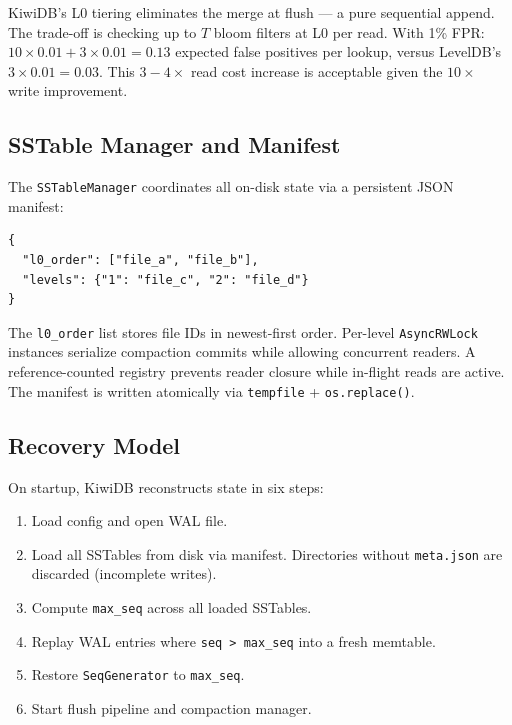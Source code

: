 \documentclass[conference]{IEEEtran}
\begin{document}
KiwiDB's L0 tiering eliminates the merge at flush --- a pure sequential append. The trade-off is checking up to $T$ bloom filters at L0 per read. With 1\% FPR: $10 \times 0.01 + 3 \times 0.01 = 0.13$ expected false positives per lookup, versus LevelDB's $3 \times 0.01 = 0.03$. This $3{-}4\times$ read cost increase is acceptable given the $10\times$ write improvement.

\subsection{SSTable Manager and Manifest}

The \texttt{SSTableManager} coordinates all on-disk state via a persistent JSON manifest:

\begin{lstlisting}[caption={Manifest structure.},label={lst:manifest}]
{
  "l0_order": ["file_a", "file_b"],
  "levels": {"1": "file_c", "2": "file_d"}
}
\end{lstlisting}

The \texttt{l0\_order} list stores file IDs in newest-first order. Per-level \texttt{AsyncRWLock} instances serialize compaction commits while allowing concurrent readers. A reference-counted registry prevents reader closure while in-flight reads are active. The manifest is written atomically via \texttt{tempfile} + \texttt{os.replace()}.

\subsection{Recovery Model}

On startup, KiwiDB reconstructs state in six steps:

\begin{enumerate}[leftmargin=*]
    \item Load config and open WAL file.
    \item Load all SSTables from disk via manifest. Directories without \texttt{meta.json} are discarded (incomplete writes).
    \item Compute \texttt{max\_seq} across all loaded SSTables.
    \item Replay WAL entries where \texttt{seq > max\_seq} into a fresh memtable.
    \item Restore \texttt{SeqGenerator} to \texttt{max\_seq}.
    \item Start flush pipeline and compaction manager.
\end{enumerate}
\end{document}
